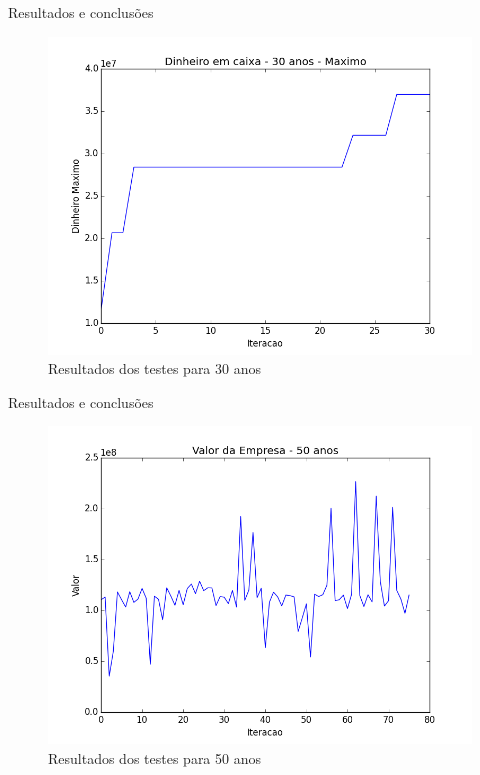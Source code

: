 \documentclass[10pt]{beamer}
\begin{document}
\begin{frame}{Resultados e conclusões}
	\begin{figure}
		\centering
		\includegraphics[width=1\linewidth]{money-30yrs-best}
		\caption{Resultados dos testes para 30 anos}
		\label{fig:money-30yrs-best}
	\end{figure}
	
\end{frame}

\begin{frame}{Resultados e conclusões}
	\begin{figure}
		\centering
		\includegraphics[width=1\linewidth]{value-50yrs}
		\caption{Resultados dos testes para 50 anos}
		\label{fig:value-50yrs}
	\end{figure}
	
\end{frame}
\end{document}
